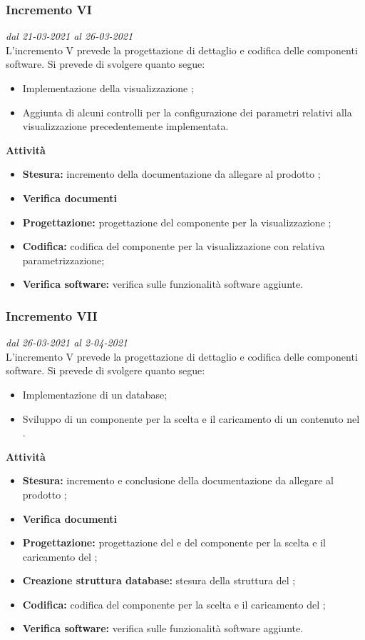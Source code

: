 \subsubsection{Incremento VI}
\textit{dal 21-03-2021 al 26-03-2021}\\
L'incremento V prevede la progettazione di dettaglio e codifica delle componenti software. Si prevede di svolgere quanto segue:
\begin{itemize}
\item Implementazione della visualizzazione ;
\item Aggiunta di alcuni controlli per la configurazione dei parametri relativi alla visualizzazione precedentemente implementata.
\end{itemize}
\textbf{Attività}
\begin{itemize}
\item \textbf{Stesura:} incremento della documentazione da allegare al prodotto ;
\item \textbf{Verifica documenti}
\item \textbf{Progettazione:} progettazione del componente per la visualizzazione ;
\item \textbf{Codifica:} codifica del componente per la visualizzazione con relativa parametrizzazione;
\item \textbf{Verifica software:} verifica sulle funzionalità software aggiunte.
\end{itemize}

\subsubsection{Incremento VII}
\textit{dal 26-03-2021 al 2-04-2021}\\
L'incremento V prevede la progettazione di dettaglio e codifica delle componenti software. Si prevede di svolgere quanto segue:
\begin{itemize}
\item Implementazione di un database;
\item Sviluppo di un componente per la scelta e il caricamento di un  contenuto nel .
\end{itemize}
\textbf{Attività}
\begin{itemize}
\item \textbf{Stesura:} incremento e conclusione della documentazione da allegare al prodotto ;
\item \textbf{Verifica documenti}
\item \textbf{Progettazione:} progettazione del  e del componente per la scelta e il caricamento del ;
\item \textbf{Creazione struttura database:} stesura della struttura del ;
\item \textbf{Codifica:} codifica del componente per la scelta e il caricamento del ;
\item \textbf{Verifica software:} verifica sulle funzionalità software aggiunte.
\end{itemize}

